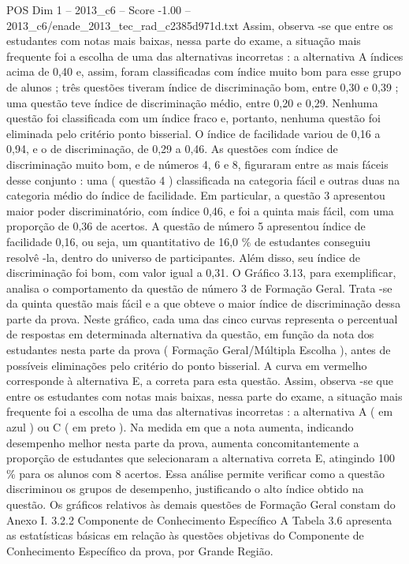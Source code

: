 \begin{textsample}{POS Dim 1 – 2013\_c6 – Score -1.00 – 2013\_c6/enade\_2013\_tec\_rad\_c2385d971d.txt}
Assim, observa -se que entre os estudantes com notas mais baixas, nessa parte do exame, a situação mais frequente foi a escolha de uma das alternativas incorretas : a alternativa A índices acima de 0,40 e, assim, foram classificadas com índice muito bom para esse grupo de alunos ; três questões tiveram índice de discriminação bom, entre 0,30 e 0,39 ; uma questão teve índice de discriminação médio, entre 0,20 e 0,29.
Nenhuma questão foi classificada com um índice fraco e, portanto, nenhuma questão foi eliminada pelo critério ponto bisserial.
O índice de facilidade variou de 0,16 a 0,94, e o de discriminação, de 0,29 a 0,46.
As questões com índice de discriminação muito bom, e de números 4, 6 e 8, figuraram entre as mais fáceis desse conjunto : uma ( questão 4 ) classificada na categoria fácil e outras duas na categoria médio do índice de facilidade.
Em particular, a questão 3 apresentou maior poder discriminatório, com índice 0,46, e foi a quinta mais fácil, com uma proporção de 0,36 de acertos.
A questão de número 5 apresentou índice de facilidade 0,16, ou seja, um quantitativo de 16,0 \% de estudantes conseguiu resolvê -la, dentro do universo de participantes.
Além disso, seu índice de discriminação foi bom, com valor igual a 0,31.
O Gráfico 3.13, para exemplificar, analisa o comportamento da questão de número 3 de Formação Geral.
Trata -se da quinta questão mais fácil e a que obteve o maior índice de discriminação dessa parte da prova.
Neste gráfico, cada uma das cinco curvas representa o percentual de respostas em determinada alternativa da questão, em função da nota dos estudantes nesta parte da prova ( Formação Geral/Múltipla Escolha ), antes de possíveis eliminações pelo critério do ponto bisserial.
A curva em vermelho corresponde à alternativa E, a correta para esta questão.
Assim, observa -se que entre os estudantes com notas mais baixas, nessa parte do exame, a situação mais frequente foi a escolha de uma das alternativas incorretas : a alternativa A ( em azul ) ou C ( em preto ).
Na medida em que a nota aumenta, indicando desempenho melhor nesta parte da prova, aumenta concomitantemente a proporção de estudantes que selecionaram a alternativa correta E, atingindo 100 \% para os alunos com 8 acertos.
Essa análise permite verificar como a questão discriminou os grupos de desempenho, justificando o alto índice obtido na questão.
Os gráficos relativos às demais questões de Formação Geral constam do Anexo I. 3.2.2 Componente de Conhecimento Específico A Tabela 3.6 apresenta as estatísticas básicas em relação às questões objetivas do Componente de Conhecimento Específico da prova, por Grande Região.

\end{textsample}
